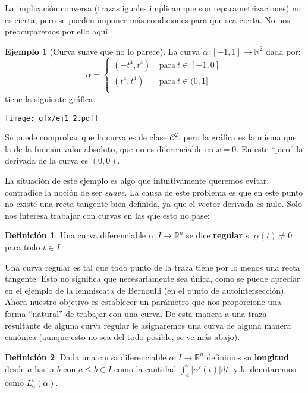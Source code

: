 \documentclass{article}
\theoremstyle{definition}
\newtheorem{define}{Definición}
\newtheorem{ejem}{Ejemplo}
\newcommand{\reales}{\mathbb{R}}
\newcommand{\claseck}[1]{\mathcal{C}^{#1}}
\begin{document}
La implicación conversa (trazas iguales implican que son reparametrizaciones) no es cierta, pero se pueden imponer más condiciones para que sea cierta. No nos preocuparemos por ello aquí.

\begin{ejem}[Curva suave que no lo parece]
	La curva $\alpha: [-1, 1] \rightarrow \reales^{2}$ dada por:
	\begin{equation}
		\alpha = \left\lbrace \begin{array}{lr}
			(-t^4, t^4 )& \ \text{para}\ t \in [-1, 0]\\
			(t^4, t^4 )& \ \text{para}\ t \in (0, 1]\\
		\end{array} \right.
	\end{equation}
	tiene la siguiente gráfica:
	\begin{center}
		\texttt{[image: gfx/ej1\_2.pdf]}
	\end{center}
	Se puede comprobar que la curva es de clase $\claseck{2}$, pero la gráfica es la misma que la de la función valor absoluto, que no es diferenciable en $x=0$. En este ``pico'' la derivada de la curva es $(0, 0)$.
\end{ejem}
La situación de este ejemplo es algo que intuitivamente queremos evitar: contradice la noción de ser \textit{suave}. La causa de este problema es que en este punto no existe una recta tangente bien definida, ya que el vector derivada es nulo. Solo nos interesa trabajar con curvas en las que esto no pase:

\begin{define}
	Una curva diferenciable $\alpha: I \rightarrow \reales^{n}$ se dice \textbf{regular} si $\alpha(t) \neq 0$ para todo $t \in I$. 
\end{define}

Una curva regular es tal que todo punto de la traza tiene por lo menos una recta tangente. Esto no significa que necesariamente sea única, como se puede apreciar en el ejemplo de la lemniscata de Bernoulli (en el punto de autointersección).\\ 

Ahora nuestro objetivo es establecer un parámetro que nos proporcione una forma ``natural'' de trabajar con una curva. De esta manera a una traza resultante de alguna curva regular le asignaremos una curva de alguna manera canónica (aunque esto no sea del todo posible, se ve más abajo).

\begin{define}
	Dada una curva diferenciable $\alpha: I \rightarrow \reales^{n}$ definimos su \textbf{longitud} desde $a$ hasta $b$ con $a\leq b \in I$ como la cantidad $\int_a^b |\alpha' (t)| dt$, y la denotaremos como $L_{a}^{b} (\alpha)$. 
\end{define}
\end{document}
